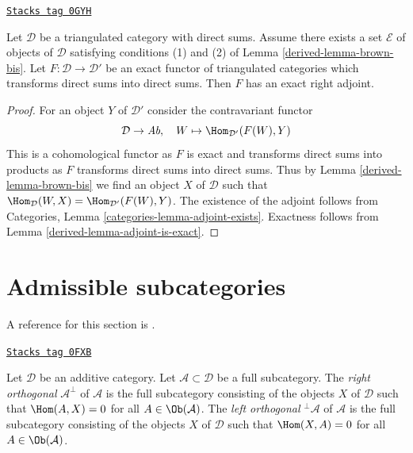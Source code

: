 \begin{proposition}
\label{derived-proposition-brown-bis}
\href{https://stacks.math.columbia.edu/tag/0GYH}{\texttt{Stacks tag 0GYH}}

Let $\mathcal{D}$ be a triangulated category with direct sums.
Assume there exists a set $\mathcal{E}$ of objects of $\mathcal{D}$
satisfying conditions (1) and (2) of Lemma \ref{derived-lemma-brown-bis}.
Let $F : \mathcal{D} \to \mathcal{D}'$ be an exact functor of triangulated
categories which transforms direct sums into direct sums.
Then $F$ has an exact right adjoint.
\end{proposition}

\begin{proof}

For an object $Y$ of $\mathcal{D}'$ consider the contravariant functor
$$
\mathcal{D} \to \textit{Ab},\quad W \mapsto \Hom_{\mathcal{D}'}(F(W), Y)
$$
This is a cohomological functor as $F$ is exact and transforms direct sums
into products as $F$ transforms direct sums into direct sums. Thus by
Lemma \ref{derived-lemma-brown-bis} we find an object $X$ of $\mathcal{D}$ such that
$\Hom_\mathcal{D}(W, X) = \Hom_{\mathcal{D}'}(F(W), Y)$.
The existence of the adjoint follows from
Categories, Lemma \ref{categories-lemma-adjoint-exists}.
Exactness follows from Lemma \ref{derived-lemma-adjoint-is-exact}.
\end{proof}

\section{Admissible subcategories}
\label{derived-section-admissible}
A reference for this section is \cite[Section 1]{Bondal-Kapranov}.

\begin{definition}[Orthogonal]
\label{derived-definition-orthogonal}
\href{https://stacks.math.columbia.edu/tag/0FXB}{\texttt{Stacks tag 0FXB}}

Let $\mathcal{D}$ be an additive category. Let $\mathcal{A} \subset \mathcal{D}$
be a full subcategory. The {\it right orthogonal} $\mathcal{A}^\perp$ of
$\mathcal{A}$ is the full subcategory consisting of the objects $X$ of
$\mathcal{D}$ such that $\Hom(A, X) = 0$ for all $A \in \Ob(\mathcal{A})$.
The {\it left orthogonal} ${}^\perp\mathcal{A}$ of
$\mathcal{A}$ is the full subcategory consisting of the objects $X$ of
$\mathcal{D}$ such that $\Hom(X, A) = 0$ for all $A \in \Ob(\mathcal{A})$.
\end{definition}

